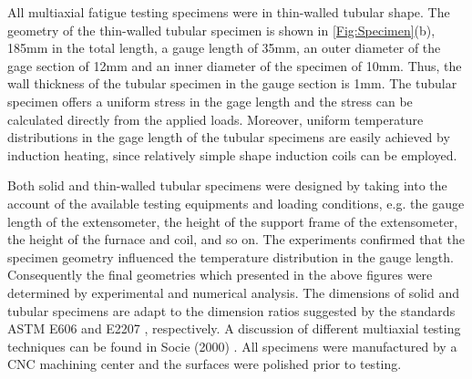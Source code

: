 All multiaxial fatigue testing specimens were in thin-walled tubular shape.
The geometry of the thin-walled tubular specimen is shown in \ref{Fig:Specimen}(b), 185mm in the total length, a gauge length of 35mm, an outer diameter of the gage section of 12mm and an inner diameter of the specimen of 10mm.
Thus, the wall thickness of the tubular specimen in the gauge section is 1mm.
The tubular specimen offers a uniform stress in the gage length and the stress can be calculated directly from the applied loads.
Moreover, uniform temperature distributions in the gage length of the tubular specimens are easily achieved by induction heating, since relatively simple shape induction coils can be employed.

Both solid and thin-walled tubular specimens were designed by taking into the account of the available testing equipments and loading conditions, e.g. the gauge length of the extensometer, the height of the support frame of the extensometer, the height of the furnace and coil, and so on.
The experiments confirmed that the specimen geometry influenced the temperature distribution in the gauge length.
Consequently the final geometries which presented in the above figures were determined by experimental and numerical analysis.
The dimensions of solid and tubular specimens are adapt to the dimension ratios suggested by the standards ASTM E606 \cite{astm1998standard} and E2207 \cite{standard2007e2207}, respectively.
A discussion of different multiaxial testing techniques can be found in Socie (2000) \cite{socie2000multiaxial}.
All specimens were manufactured by a CNC machining center and the surfaces were polished prior to testing.




